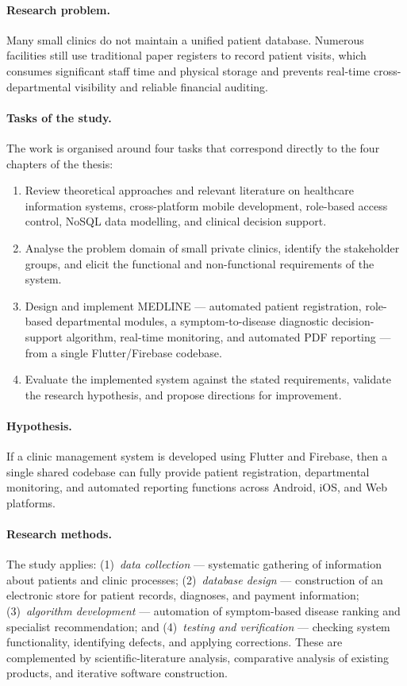 \documentclass[12pt,a4paper,oneside]{report}
\begin{document}
\paragraph{Research problem.}
Many small clinics do not maintain a unified patient database. Numerous
facilities still use traditional paper registers to record patient visits,
which consumes significant staff time and physical storage and prevents
real-time cross-departmental visibility and reliable financial auditing.

\paragraph{Tasks of the study.}
The work is organised around four tasks that correspond directly to the four
chapters of the thesis:
\begin{enumerate}
  \item Review theoretical approaches and relevant literature on healthcare
        information systems, cross-platform mobile development, role-based
        access control, NoSQL data modelling, and clinical decision support.
  \item Analyse the problem domain of small private clinics, identify the
        stakeholder groups, and elicit the functional and non-functional
        requirements of the system.
  \item Design and implement MEDLINE --- automated patient registration,
        role-based departmental modules, a symptom-to-disease diagnostic
        decision-support algorithm, real-time monitoring, and automated PDF
        reporting --- from a single Flutter/Firebase codebase.
  \item Evaluate the implemented system against the stated requirements,
        validate the research hypothesis, and propose directions for
        improvement.
\end{enumerate}

\paragraph{Hypothesis.}
If a clinic management system is developed using Flutter and Firebase, then a
single shared codebase can fully provide patient registration, departmental
monitoring, and automated reporting functions across Android, iOS, and Web
platforms.

\paragraph{Research methods.}
The study applies: (1)~\emph{data collection} --- systematic gathering of
information about patients and clinic processes; (2)~\emph{database design} ---
construction of an electronic store for patient records, diagnoses, and payment
information; (3)~\emph{algorithm development} --- automation of symptom-based
disease ranking and specialist recommendation; and (4)~\emph{testing and
verification} --- checking system functionality, identifying defects, and
applying corrections. These are complemented by scientific-literature analysis,
comparative analysis of existing products, and iterative software construction.
\end{document}
